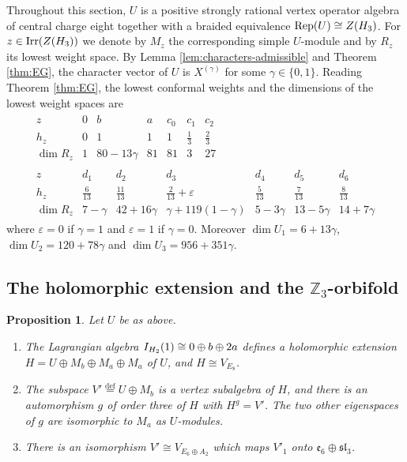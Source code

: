 \documentclass[leqno]{article}
\let\cal\relax
\newcommand{\cal}{\mathcal}
\newcommand{\Z}{\ensuremath{\mathbb{Z}}}
\newcommand{\ov}{\overset}
\newcommand{\epsi}{\varepsilon}
\DeclareMathOperator{\Irr}{Irr}
\DeclareMathOperator{\Rep}{Rep}
\newtheorem{prop}[thm]{Proposition}
\numberwithin{equation}{section}
\begin{document}
Throughout this section, $U$ is a positive strongly rational vertex operator algebra of central charge eight together with a braided equivalence $\Rep(U) \cong Z(\cal H_3)$. For $z \in \Irr(Z(\cal H_3))$ we denote by $M_z$ the corresponding simple $U$-module and by $R_z$ its lowest weight space. By Lemma \ref{lem:characters-admissible} and Theorem \ref{thm:EG}, the character vector of $U$ is $X^{(\gamma)}$ for some $\gamma \in \{0,1\}$. Reading Theorem \ref{thm:EG}, the lowest conformal weights and the dimensions of the lowest weight spaces are
\begin{equation}
\label{eq:lowest-spaces}
\begin{array}{c}
\begin{array}{c|cccccc}
z & 0 & b & a & c_0 & c_1 & c_2\\
\hline
h_z & 0 & 1 & 1 & 1 & \frac13 & \frac23\\
\dim R_z & 1 & 80-13\gamma & 81 & 81 & 3 & 27
\end{array}
\\[3mm]
\begin{array}{c|cccccc}
z & d_1 & d_2 & d_3 & d_4 & d_5 & d_6\\
\hline
h_z & \frac{6}{13} & \frac{11}{13} & \frac{2}{13}+\epsi & \frac{5}{13} & \frac{7}{13} & \frac{8}{13}\\
\dim R_z & 7-\gamma & 42+16\gamma & \gamma+119(1-\gamma) & 5-3\gamma & 13-5\gamma & 14+7\gamma
\end{array}
\end{array}
\end{equation}
where $\epsi = 0$ if $\gamma = 1$ and $\epsi = 1$ if $\gamma = 0$. Moreover $\dim U_1 = 6+13\gamma$, $\dim U_2 = 120+78\gamma$ and $\dim U_3 = 956+351\gamma$.

\subsection{The holomorphic extension and the \texorpdfstring{$\Z_3$}{Z3}-orbifold}

\begin{prop}
\label{prop:chain}
Let $U$ be as above.
\begin{enumerate}
\item The Lagrangian algebra $I_{\cal H_2}(1) \cong 0 \oplus b \oplus 2a$ defines a holomorphic extension $H = U \oplus M_b \oplus M_a \oplus M_a$ of $U$, and $H \cong V_{E_8}$.
\item The subspace $V' \ov{\mathrm{def}}{=} U \oplus M_b$ is a vertex subalgebra of $H$, and there is an automorphism $g$ of order three of $H$ with $H^g = V'$. The two other eigenspaces of $g$ are isomorphic to $M_a$ as $U$-modules.
\item There is an isomorphism $V' \cong V_{E_6 \oplus A_2}$ which maps $V'_1$ onto $\mathfrak e_6 \oplus \mathfrak{sl}_3$.
\end{enumerate}
\end{prop}
\end{document}
